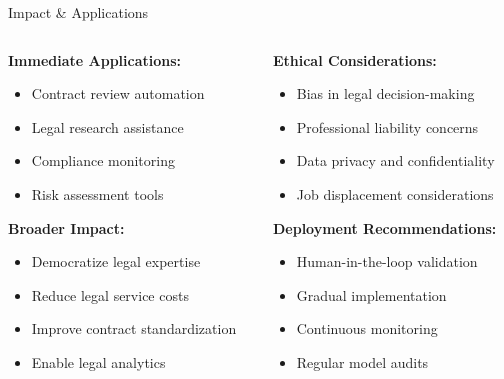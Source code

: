 \begin{frame}{Impact \& Applications}
\begin{columns}
\begin{column}{0.5\textwidth}
\textbf{Immediate Applications:}
\begin{itemize}
    \item Contract review automation
    \item Legal research assistance
    \item Compliance monitoring
    \item Risk assessment tools
\end{itemize}

\vspace{0.5cm}
\textbf{Broader Impact:}
\begin{itemize}
    \item Democratize legal expertise
    \item Reduce legal service costs
    \item Improve contract standardization
    \item Enable legal analytics
\end{itemize}
\end{column}
\begin{column}{0.5\textwidth}
\textbf{Ethical Considerations:}
\begin{itemize}
    \item Bias in legal decision-making
    \item Professional liability concerns
    \item Data privacy and confidentiality
    \item Job displacement considerations
\end{itemize}

\vspace{0.5cm}
\textbf{Deployment Recommendations:}
\begin{itemize}
    \item Human-in-the-loop validation
    \item Gradual implementation
    \item Continuous monitoring
    \item Regular model audits
\end{itemize}
\end{column}
\end{columns}
\end{frame}

